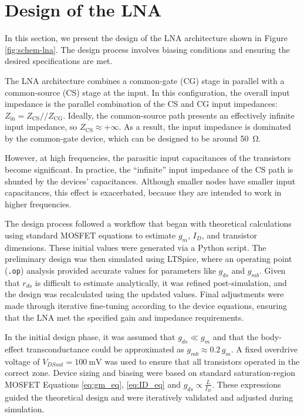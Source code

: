 \section{Design of the LNA}

In this section, we present the design of the LNA architecture shown in Figure \ref{fig:schem-lna}. The design process involves biasing conditions and ensuring the desired specifications are met.

The LNA architecture combines a common-gate (CG) stage in parallel with a common-source (CS) stage at the input. In this configuration, the overall input impedance is the parallel combination of the CS and CG input impedances: $Z_\text{in} = Z_\text{CS} // Z_\text{CG}$. Ideally, the common-source path presents an effectively infinite input impedance, so $Z_\text{CS} \approx +\infty$. As a result, the input impedance is dominated by the common-gate device, which can be designed to be around \SI{50}{\ohm}.

\label{sec:inpCap}
However, at high frequencies, the parasitic input capacitances of the transistors become significant. In practice, the “infinite” input impedance of the CS path is shunted by the devices' capacitances. Although smaller nodes have smaller input capacitances, this effect is exacerbated, because they are intended to work in higher frequencies.

The design process followed a workflow that began with theoretical calculations using standard MOSFET equations to estimate $g_m$, $I_D$, and transistor dimensions. These initial values were generated via a Python script. The preliminary design was then simulated using LTSpice, where an operating point (\texttt{.op}) analysis provided accurate values for parameters like $g_{ds}$ and $g_{mb}$. Given that $r_{ds}$ is difficult to estimate analytically, it was refined post-simulation, and the design was recalculated using the updated values. Final adjustments were made through iterative fine-tuning according to the device equations, ensuring that the LNA met the specified gain and impedance requirements.

\label{sec:assumptions}
In the initial design phase, it was assumed that $g_{ds} \ll g_m$ and that the body-effect transconductance could be approximated as $g_{mb} \approx 0.2\,g_m$. A fixed overdrive voltage of $V_{DSsat} = \SI{100}{\milli\volt}$ was used to ensure that all transistors operated in the correct zone. Device sizing and biasing were based on standard saturation-region MOSFET Equations \ref{eq:gm_eq}, \ref{eq:ID_eq} and $g_{ds} \propto \frac{L}{I_D}$\cite{AnalogCircDesign}. These expressions guided the theoretical design and were iteratively validated and adjusted during simulation.

